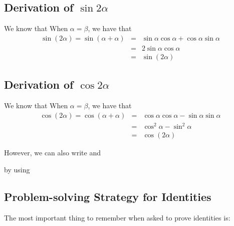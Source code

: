\subsection{Derivation of $\sin 2 \alpha$}
We know that
\nequ{\sin(\alpha + \beta) = \sin\alpha\cos\beta+\cos\alpha\sin\beta}
When $\alpha=\beta$, we have that
\begin{eqnarray*}
\sin(2\alpha)=\sin(\alpha + \alpha) &=& \sin\alpha\cos\alpha+\cos\alpha\sin\alpha\\
&=& 2\sin\alpha\cos\alpha\\
&=&\sin(2\alpha) 
\end{eqnarray*}

\subsection{Derivation of $\cos 2 \alpha$}
We know that
\nequ{\cos(\alpha + \beta) = \cos\alpha\cos\beta-\sin\alpha\sin\beta}
When $\alpha=\beta$, we have that
\begin{eqnarray*}
\cos(2\alpha)=\cos(\alpha + \alpha) &=& \cos\alpha\cos\alpha-\sin\alpha\sin\alpha\\
&=& \cos^2\alpha-\sin^2\alpha\\
&=&\cos(2\alpha) 
\end{eqnarray*}

However, we can also write
and

by using


\subsection{Problem-solving Strategy for Identities}
The most important thing to remember when asked to prove identities is:

